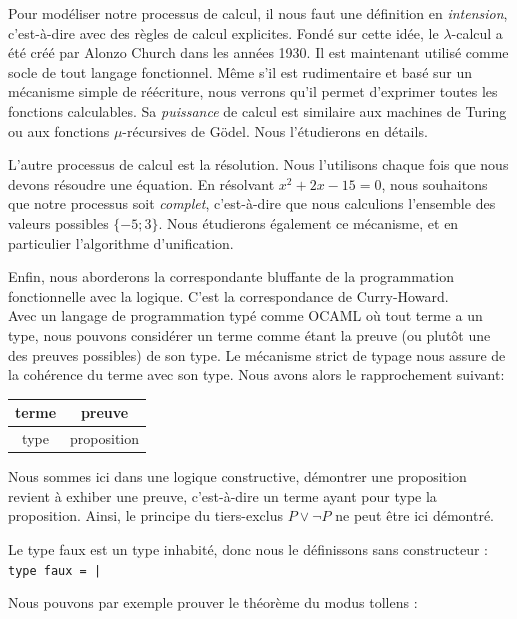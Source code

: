 \documentclass[11pt]{book}
\begin{document}
Pour modéliser notre processus de calcul, il nous faut une définition en \textit{intension}, 
c'est-à-dire avec des règles de calcul explicites. Fondé sur
cette idée, le $\lambda$-calcul a été créé par Alonzo Church dans les années 1930.
Il est maintenant utilisé comme socle de tout langage fonctionnel. 
Même s'il est  rudimentaire et basé sur un mécanisme simple de réécriture,
nous verrons qu'il permet d'exprimer toutes les fonctions calculables. Sa \textit{puissance}
de calcul est similaire aux machines de Turing ou aux fonctions $\mu$-récursives de Gödel.
Nous l'étudierons en détails.

\vspace{0.3cm}
L'autre processus de calcul est la résolution. Nous l'utilisons chaque fois que nous devons résoudre
une équation. En résolvant $x^2+2x-15=0$, nous souhaitons que notre processus 
soit \textit{complet}, c'est-à-dire que nous calculions 
l'ensemble des valeurs possibles $\{-5; 3\}$.
 Nous étudierons également  ce mécanisme, et en particulier l'algorithme d'unification.

\vspace{0.3cm}
Enfin, nous aborderons la correspondante bluffante de la programmation fonctionnelle avec la logique. 
C'est la correspondance de Curry-Howard. \\
Avec un langage de programmation typé comme OCAML où tout terme a un type, nous pouvons
considérer un terme comme étant  la preuve (ou plutôt une des preuves possibles) de son type. 
Le mécanisme strict de typage nous assure de la cohérence du terme avec son type.
Nous avons alors le rapprochement suivant:

\begin{center}
\begin{tabular}[]{|c|c|}
  \hline
  terme & preuve \\
  \hline
  type & proposition \\
  \hline
\end{tabular}

\end{center}
Nous sommes ici dans une logique constructive, démontrer une proposition revient à exhiber une preuve, c'est-à-dire 
un terme ayant pour type la proposition.
Ainsi, le principe du tiers-exclus $P \vee  \neg P$ ne peut être ici démontré.

Le type faux est un type inhabité, donc nous le définissons sans constructeur : \verb+ type faux = | +

Nous pouvons par exemple prouver le théorème du modus tollens : \\
\end{document}
